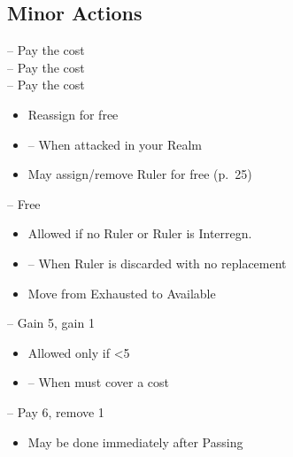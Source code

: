 \documentclass[10pt]{article}
\begin{document}
\subsection*{Minor Actions}
 -- Pay the \ducat cost\\
 -- Pay the \milpower cost\\
 -- Pay the \milpower cost\\
\begin{itemize}
	\item Reassign for free
	\item \reaction -- When attacked in your Realm
	\item May assign/remove Ruler for free (p.~25)
\end{itemize}
 -- Free
\begin{itemize}
	\item Allowed if no Ruler or Ruler is \dprime Interregn.\dprime
	\item \reaction -- When Ruler is discarded with no replacement
\end{itemize}

\begin{itemize}
	\item Move \manpower from Exhausted to Available
\end{itemize}

 -- Gain 5\ducats, gain 1\interest
\begin{itemize}
	\item Allowed only if <5\interest
	\item \reaction -- When must cover a cost
\end{itemize}
 -- Pay 6\ducats, remove 1\interest
\begin{itemize}
	\item May be done immediately after Passing
\end{itemize}
\end{document}
